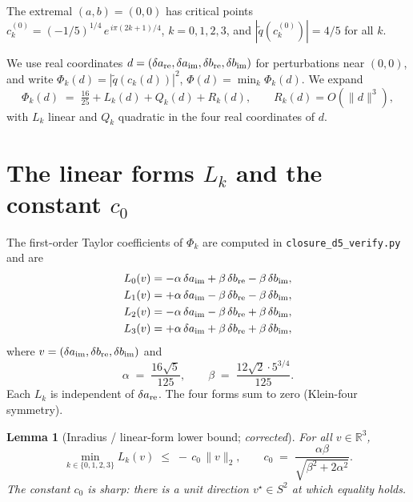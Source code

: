 \documentclass[11pt,a4paper]{article}
\newtheorem{lemma}[theorem]{Lemma}
\begin{document}
The extremal $(a,b)=(0,0)$ has critical points
$c_k^{(0)} = (-1/5)^{1/4}\, e^{\,i\pi(2k+1)/4}$, $k=0,1,2,3$, and
$|\widetilde q(c_k^{(0)})|=4/5$ for all $k$.

We use real coordinates $d = (\delta a_{\rm re}, \delta a_{\rm im},
\delta b_{\rm re}, \delta b_{\rm im})$ for perturbations near $(0,0)$,
and write $\Phi_k(d) = |\widetilde q(c_k(d))|^2$, $\Phi(d) = \min_k
\Phi_k(d)$. We expand
\begin{equation}
\Phi_k(d) \;=\; \tfrac{16}{25} + L_k(d) + Q_k(d) + R_k(d),
\qquad R_k(d) = O(\|d\|^3),
\label{eq:Taylor}
\end{equation}
with $L_k$ linear and $Q_k$ quadratic in the four real coordinates of $d$.

\section{The linear forms $L_k$ and the constant $c_0$}
\label{sec:linear}

The first-order Taylor coefficients of $\Phi_k$ are computed in
\verb|closure_d5_verify.py| and are
\begin{align*}
L_0(v) &= -\alpha\,\delta a_{\rm im} + \beta\,\delta b_{\rm re} - \beta\,\delta b_{\rm im},\\
L_1(v) &= +\alpha\,\delta a_{\rm im} - \beta\,\delta b_{\rm re} - \beta\,\delta b_{\rm im},\\
L_2(v) &= -\alpha\,\delta a_{\rm im} - \beta\,\delta b_{\rm re} + \beta\,\delta b_{\rm im},\\
L_3(v) &= +\alpha\,\delta a_{\rm im} + \beta\,\delta b_{\rm re} + \beta\,\delta b_{\rm im},
\end{align*}
where $v = (\delta a_{\rm im}, \delta b_{\rm re}, \delta b_{\rm im})$
and
\begin{equation}
\boxed{\;\alpha \;=\; \frac{16\sqrt 5}{125}, \qquad
\beta \;=\; \frac{12\sqrt 2 \cdot 5^{3/4}}{125}.\;}
\end{equation}
Each $L_k$ is independent of $\delta a_{\rm re}$. The four forms sum to
zero (Klein-four symmetry).

\begin{lemma}[Inradius / linear-form lower bound; \emph{corrected}]
\label{lem:c0}
For all $v\in\mathbb{R}^3$,
\begin{equation}
\min_{k\in\{0,1,2,3\}} L_k(v) \;\le\; -\,c_0\,\|v\|_2,
\qquad
c_0 \;=\; \frac{\alpha\beta}{\sqrt{\beta^2 + 2\alpha^2}}.
\end{equation}
The constant $c_0$ is sharp: there is a unit direction
$v^\star \in S^2$ at which equality holds.
\end{lemma}
\end{document}
